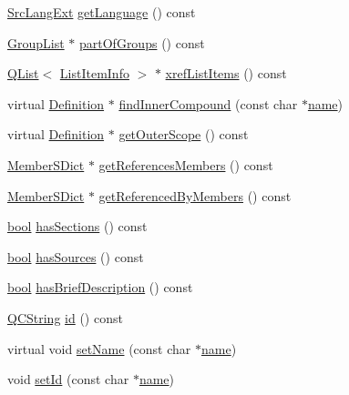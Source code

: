\begin{DoxyCompactItemize}
\item 
\hyperlink{types_8h_a9974623ce72fc23df5d64426b9178bf2}{Src\+Lang\+Ext} \hyperlink{class_definition_a55485230d99cc877348db64f01dde092}{get\+Language} () const 
\item 
\hyperlink{class_group_list}{Group\+List} $\ast$ \hyperlink{class_definition_a16251e130cfce01ff6734e46f17fb934}{part\+Of\+Groups} () const 
\item 
\hyperlink{class_q_list}{Q\+List}$<$ \hyperlink{struct_list_item_info}{List\+Item\+Info} $>$ $\ast$ \hyperlink{class_definition_a0b83ac7e3a42baf9bd1bac90a83f07cc}{xref\+List\+Items} () const 
\item 
virtual \hyperlink{class_definition}{Definition} $\ast$ \hyperlink{class_definition_ad0ab125ac1d11e17d8cd5a4e5a0eea23}{find\+Inner\+Compound} (const char $\ast$\hyperlink{class_definition_a99481361779e85f0c1556709de7d9e5b}{name})
\item 
virtual \hyperlink{class_definition}{Definition} $\ast$ \hyperlink{class_definition_ab82806456f4f27020863477cfbcdecd3}{get\+Outer\+Scope} () const 
\item 
\hyperlink{class_member_s_dict}{Member\+S\+Dict} $\ast$ \hyperlink{class_definition_a2d9e83cac9c3816d2469be611bf387e6}{get\+References\+Members} () const 
\item 
\hyperlink{class_member_s_dict}{Member\+S\+Dict} $\ast$ \hyperlink{class_definition_a2648ef330f15e171cb3b077ced5195db}{get\+Referenced\+By\+Members} () const 
\item 
\hyperlink{qglobal_8h_a1062901a7428fdd9c7f180f5e01ea056}{bool} \hyperlink{class_definition_aeb4c2067227675b9aeb7815879bf98ce}{has\+Sections} () const 
\item 
\hyperlink{qglobal_8h_a1062901a7428fdd9c7f180f5e01ea056}{bool} \hyperlink{class_definition_a09f0337fd7803a59bc8df241460231ae}{has\+Sources} () const 
\item 
\hyperlink{qglobal_8h_a1062901a7428fdd9c7f180f5e01ea056}{bool} \hyperlink{class_definition_a38e2857d0563551b1280481d250d2a24}{has\+Brief\+Description} () const 
\item 
\hyperlink{class_q_c_string}{Q\+C\+String} \hyperlink{class_definition_a19d4680f1998fc384e37c90106a4ed61}{id} () const 
\item 
virtual void \hyperlink{class_definition_aaa3c1632bd89cb3db7c7713df4e36db0}{set\+Name} (const char $\ast$\hyperlink{class_definition_a99481361779e85f0c1556709de7d9e5b}{name})
\item 
void \hyperlink{class_definition_ae653664eee43cfe5992cd91377f8e91b}{set\+Id} (const char $\ast$\hyperlink{class_definition_a99481361779e85f0c1556709de7d9e5b}{name})

\end{DoxyCompactItemize}
